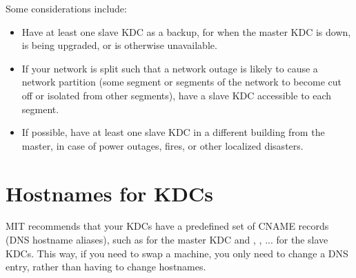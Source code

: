 \documentclass[letterpaper,10pt,english]{sphinxmanual}
\begin{document}
Some considerations include:
\begin{itemize}
\item {} 
Have at least one slave KDC as a backup, for when the master KDC is
down, is being upgraded, or is otherwise unavailable.

\item {} 
If your network is split such that a network outage is likely to
cause a network partition (some segment or segments of the network
to become cut off or isolated from other segments), have a slave KDC
accessible to each segment.

\item {} 
If possible, have at least one slave KDC in a different building
from the master, in case of power outages, fires, or other localized
disasters.

\end{itemize}


\section{Hostnames for KDCs}
\label{admin/realm_config:kdc-hostnames}\label{admin/realm_config:hostnames-for-kdcs}
MIT recommends that your KDCs have a predefined set of CNAME records
(DNS hostname aliases), such as  for the master KDC and
, , ... for the slave KDCs.  This way, if
you need to swap a machine, you only need to change a DNS entry,
rather than having to change hostnames.
\end{document}
